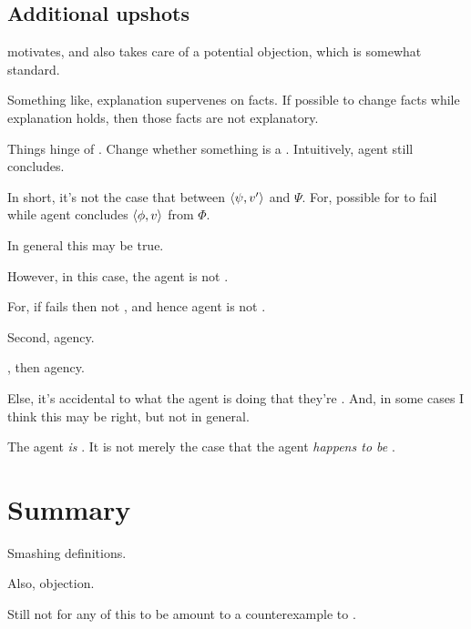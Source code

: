 \subsection{Additional upshots}

\begin{note}
  \color{red}
   motivates, and also takes care of a potential objection, which is somewhat standard.

  Something like, explanation supervenes on facts.
  If possible to change facts while explanation holds, then those facts are not explanatory.

  Things hinge of \requ{}.
  Change whether something is a \requ{}.
  Intuitively, agent still concludes.

  In short, it's not the case that \ros{} between \(\langle \psi, v' \rangle\) and \(\Psi\).
  For, possible for \ros{} to fail while agent concludes \(\langle \phi, v \rangle\) from \(\Phi\).

  In general this may be true.

  However, in this case, the agent is not \tCV{}.

  For, if \ros{} fails then not \fc{}, and hence agent is not \tCV{}.
\end{note}

\begin{note}
  Second, agency.

  \tCV{}, then agency.

  Else, it's accidental to what the agent is doing that they're \tCV{}.
  And, in some cases I think this may be right, but not in general.

  The agent \emph{is} \tCV{}.
  It is not merely the case that the agent \emph{happens to be} \tCV{}.
\end{note}

\section*{Summary}

\begin{note}
  Smashing definitions.
\end{note}

\begin{note}
  Also, objection.
\end{note}

\begin{note}
  Still not  for any of this to be amount to a counterexample to \issueConstraint{}.
\end{note}






